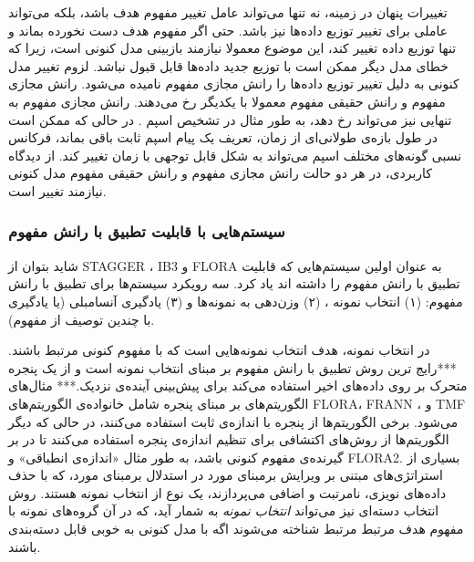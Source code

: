 تغییرات پنهان در زمینه، نه تنها می‌تواند عامل تغییر مفهوم هدف باشد، بلکه می‌تواند عاملی برای تغییر توزیع داده‌ها
نیز باشد. حتی اگر مفهوم هدف دست نخورده بماند و تنها توزیع داده تغییر کند، این موضوع معمولا نیازمند  بازبینی مدل
کنونی است، زیرا که خطای مدل دیگر ممکن است با توزیع جدید داده‌ها قابل قبول نباشد. لزوم تغییر مدل کنونی به دلیل تغییر توزیع داده‌ها را رانش مجازی مفهوم
 \cite{widmerkubat1993}
نامیده می‌شود. رانش مجازی مفهوم و رانش حقیقی مفهوم معمولا با یکدیگر رخ می‌دهند. رانش مجازی مفهوم به تنهایی نیز می‌تواند رخ دهد، به طور مثال در تشخیص اسپم
. 
در حالی که ممکن است در طول بازه‌ی طولانی‌ای از زمان، تعریف یک پیام اسپم ثابت باقی بماند، فرکانس
نسبی گونه‌های مختلف اسپم می‌تواند به شکل قابل توجهی با زمان تغییر کند. از دیدگاه کاربردی، در هر دو حالت رانش مجازی مفهوم و رانش حقیقی مفهوم مدل کنونی نیازمند تغییر است.


\subsubsection{
سیستم‌هایی با قابلیت تطبیق با رانش مفهوم
}
شاید بتوان از STAGGER
\cite{schlimmergranger1986}، 
IB3
\cite{ahaetal1991}
و 
FLORA
\cite{widmerkubat1996}
به عنوان اولین سیستم‌هایی که قابلیت تطبیق با رانش مفهوم را داشته اند یاد کرد. سه رویکرد سیستم‌ها برای تطبیق با رانش مفهوم: (۱) انتخاب نمونه
، 
(۲) وزن‌دهی به نمونه‌ها
و (۳) یادگیری آنسامبلی
(یا یادگیری با چندین توصیف از مفهوم).


در انتخاب نمونه، هدف انتخاب نمونه‌هایی است که با مفهوم کنونی مرتبط باشند. ***رایج ترین روش تطبیق با رانش مفهوم بر مبنای انتخاب نمونه است و از یک پنجره
متحرک بر روی داده‌های اخیر استفاده می‌کند برای پیش‌بینی آینده‌ی نزدیک.*** مثال‌های الگوریتم‌های بر مبنای پنجره شامل خانواده‌ی الگوریتم‌های 
FLORA، 
FRANN
\cite{kubatwidmer1994}، 
و 
TMF
 \cite{salganicoff1997}
می‌شود. برخی الگوریتم‌ها از پنجره با اندازه‌ی ثابت استفاده می‌کنند، در حالی که دیگر الگوریتم‌ها از روش‌های اکتشافی
برای تنظیم اندازه‌ی پنجره استفاده می‌کنند تا در بر گیرنده‌ی مفهوم کنونی باشد، به طور مثال «اندازه‌ی انطباقی»
 \cite{klinkenberg2004}
و 
FLORA2. 
بسیاری از استراتژی‌های مبتنی بر ویرایش برمبنای مورد
در استدلال برمبنای مورد، که با حذف داده‌های نویزی، نامرتبت و اضافی
می‌پردازند، یک نوع از انتخاب نمونه هستند.
\cite{cunninghametal2003}
روش انتخاب دسته‌ای
 \cite{klinkenberg2004}
نیز می‌تواند 
\textit{
انتخاب نمونه
} 
به شمار آید، که در آن گروه‌های نمونه با مفهوم هدف مرتبط مرتبط شناخته می‌شوند اگه با مدل کنونی به خوبی قابل دسته‌بندی
باشند.

